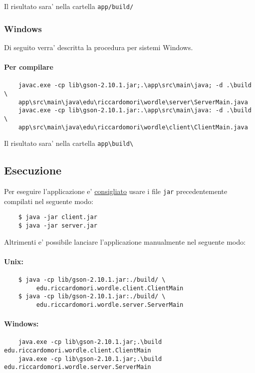 Il risultato sara' nella cartella \texttt{app/build/}

\medskip
\subsubsection{Windows}
Di seguito verra' descritta la procedura per sistemi Windows.

\paragraph{Per compilare}
\begin{verbatim}
	javac.exe -cp lib\gson-2.10.1.jar;.\app\src\main\java; -d .\build \ 
	app\src\main\java\edu\riccardomori\wordle\server\ServerMain.java
	javac.exe -cp lib\gson-2.10.1.jar:.\app\src\main\java: -d .\build \
	app\src\main\java\edu\riccardomori\wordle\client\ClientMain.java
\end{verbatim}

Il risultato sara' nella cartella \texttt{app\textbackslash build\textbackslash}

\bigskip
\subsection{Esecuzione}

Per eseguire l'applicazione e' \underline{consigliato} usare i file \texttt{jar} precedentemente compilati nel seguente modo:
\begin{verbatim}
	$ java -jar client.jar
	$ java -jar server.jar
\end{verbatim}

Altrimenti e' possibile lanciare l'applicazione manualmente nel seguente modo:

\paragraph{Unix:}
\begin{verbatim}
	$ java -cp lib/gson-2.10.1.jar:./build/ \
	     edu.riccardomori.wordle.client.ClientMain
	$ java -cp lib/gson-2.10.1.jar:./build/ \
	     edu.riccardomori.wordle.server.ServerMain
\end{verbatim}


\paragraph{Windows:}
\begin{verbatim}
	java.exe -cp lib\gson-2.10.1.jar;.\build edu.riccardomori.wordle.client.ClientMain
	java.exe -cp lib\gson-2.10.1.jar;.\build edu.riccardomori.wordle.server.ServerMain
\end{verbatim}
